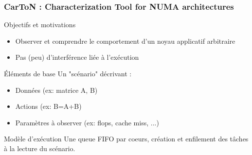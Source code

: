 \documentclass[xcolor={usenames,dvipsnames,svgnames,table}, aspectratio=43]{beamer}
\begin{document}
\begin{frame}
  \frametitle{CarToN : Characterization Tool for NUMA architectures}

  \begin{block}{Objectifs et motivations}
    \begin{itemize}
      \item Observer et comprendre le comportement d'un noyau applicatif arbitraire
      \item Pas (peu) d'interférence liée à l'exécution
    \end{itemize}
  \end{block}

  \begin{block}{Éléments de base}
    Un "scénario" décrivant :
    \begin{itemize}
      \item Données (ex: matrice A, B)
      \item Actions (ex: B=A+B)
      \item Paramètres à observer (ex: flops, cache miss, ...)
    \end{itemize}
  \end{block}

  \begin{block}{Modèle d'exécution}
    Une queue FIFO par coeurs, création et enfilement des tâches à la lecture du scénario.
  \end{block}
\end{frame}
\end{document}

